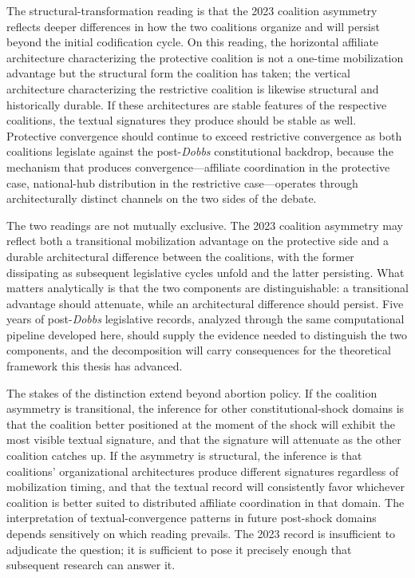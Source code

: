 The structural-transformation reading is that the 2023 coalition asymmetry reflects deeper differences in how the two coalitions organize and will persist beyond the initial codification cycle. On this reading, the horizontal affiliate architecture characterizing the protective coalition is not a one-time mobilization advantage but the structural form the coalition has taken; the vertical architecture characterizing the restrictive coalition is likewise structural and historically durable. If these architectures are stable features of the respective coalitions, the textual signatures they produce should be stable as well. Protective convergence should continue to exceed restrictive convergence as both coalitions legislate against the post-\textit{Dobbs} constitutional backdrop, because the mechanism that produces convergence---affiliate coordination in the protective case, national-hub distribution in the restrictive case---operates through architecturally distinct channels on the two sides of the debate.
 
The two readings are not mutually exclusive. The 2023 coalition asymmetry may reflect both a transitional mobilization advantage on the protective side and a durable architectural difference between the coalitions, with the former dissipating as subsequent legislative cycles unfold and the latter persisting. What matters analytically is that the two components are distinguishable: a transitional advantage should attenuate, while an architectural difference should persist. Five years of post-\textit{Dobbs} legislative records, analyzed through the same computational pipeline developed here, should supply the evidence needed to distinguish the two components, and the decomposition will carry consequences for the theoretical framework this thesis has advanced.
 
The stakes of the distinction extend beyond abortion policy. If the coalition asymmetry is transitional, the inference for other constitutional-shock domains is that the coalition better positioned at the moment of the shock will exhibit the most visible textual signature, and that the signature will attenuate as the other coalition catches up. If the asymmetry is structural, the inference is that coalitions' organizational architectures produce different signatures regardless of mobilization timing, and that the textual record will consistently favor whichever coalition is better suited to distributed affiliate coordination in that domain. The interpretation of textual-convergence patterns in future post-shock domains depends sensitively on which reading prevails. The 2023 record is insufficient to adjudicate the question; it is sufficient to pose it precisely enough that subsequent research can answer it.
 
